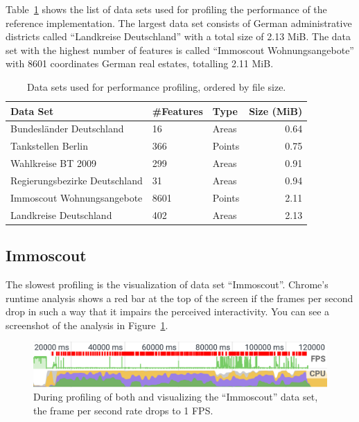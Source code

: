 Table~\ref{tab:evaluation:performance:data-sets} shows the list of data sets used for profiling the performance of the reference implementation.
The largest data set consists of German administrative districts called ``Landkreise Deutschland'' with a total size of 2.13 MiB.
The data set with the highest number of features is called ``Immoscout Wohnungsangebote'' with 8601 coordinates German real estates, totalling 2.11 MiB.

\begin{table}[ht]
  \centering
  \caption{Data sets used for performance profiling, ordered by file size.}%
  \label{tab:evaluation:performance:data-sets}
  \begin{tabular}{lllr}
    Data Set & \#Features & Type & Size (MiB) \\
    \hline
    Bundesländer Deutschland      & 16   & Areas  & 0.64 \\
    Tankstellen Berlin            & 366  & Points & 0.75 \\
    Wahlkreise BT 2009            & 299  & Areas  & 0.91 \\
    Regierungsbezirke Deutschland & 31   & Areas  & 0.94 \\
    Immoscout Wohnungsangebote    & 8601 & Points & 2.11 \\
    Landkreise Deutschland        & 402  & Areas  & 2.13 \\
  \end{tabular}
\end{table}


\subsection{Immoscout}
The slowest profiling is the visualization of data set ``Immoscout''.
Chrome's runtime analysis shows a red bar at the top of the screen if the frames per second drop in such a way that it impairs the perceived interactivity.
You can see a screenshot of the analysis in Figure~\ref{fig:evaluation:performance:profiling:immoscout:fps}.


\begin{figure}[ht]
  \centering
  \includegraphics[width=\textwidth]{figures/evaluation/performance/profiles/immoscout_both/fps}
  \caption{During profiling of both \tmap{} and \gv{} visualizing the ``Immoscout'' data set, the frame per second rate drops to 1 FPS.}
  \label{fig:evaluation:performance:profiling:immoscout:fps}
\end{figure}

